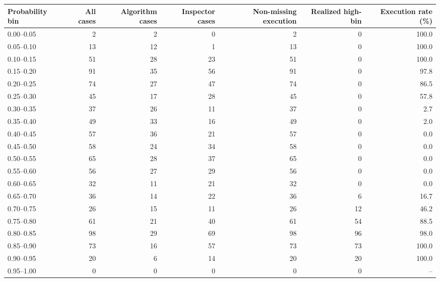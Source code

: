 \begin{tabular}[t]{lrrrrrr}
\toprule
Probability bin & All cases & Algorithm cases & Inspector cases & Non-missing execution & Realized high-bin & Execution rate (\%)\\
\midrule
0.00--0.05 & 2 & 2 & 0 & 2 & 0 & 100.0\\
0.05--0.10 & 13 & 12 & 1 & 13 & 0 & 100.0\\
0.10--0.15 & 51 & 28 & 23 & 51 & 0 & 100.0\\
0.15--0.20 & 91 & 35 & 56 & 91 & 0 & 97.8\\
0.20--0.25 & 74 & 27 & 47 & 74 & 0 & 86.5\\
0.25--0.30 & 45 & 17 & 28 & 45 & 0 & 57.8\\
0.30--0.35 & 37 & 26 & 11 & 37 & 0 & 2.7\\
0.35--0.40 & 49 & 33 & 16 & 49 & 0 & 2.0\\
0.40--0.45 & 57 & 36 & 21 & 57 & 0 & 0.0\\
0.45--0.50 & 58 & 24 & 34 & 58 & 0 & 0.0\\
0.50--0.55 & 65 & 28 & 37 & 65 & 0 & 0.0\\
0.55--0.60 & 56 & 27 & 29 & 56 & 0 & 0.0\\
0.60--0.65 & 32 & 11 & 21 & 32 & 0 & 0.0\\
0.65--0.70 & 36 & 14 & 22 & 36 & 6 & 16.7\\
0.70--0.75 & 26 & 15 & 11 & 26 & 12 & 46.2\\
0.75--0.80 & 61 & 21 & 40 & 61 & 54 & 88.5\\
0.80--0.85 & 98 & 29 & 69 & 98 & 96 & 98.0\\
0.85--0.90 & 73 & 16 & 57 & 73 & 73 & 100.0\\
0.90--0.95 & 20 & 6 & 14 & 20 & 20 & 100.0\\
0.95--1.00 & 0 & 0 & 0 & 0 & 0 & --\\
\bottomrule
\end{tabular}
